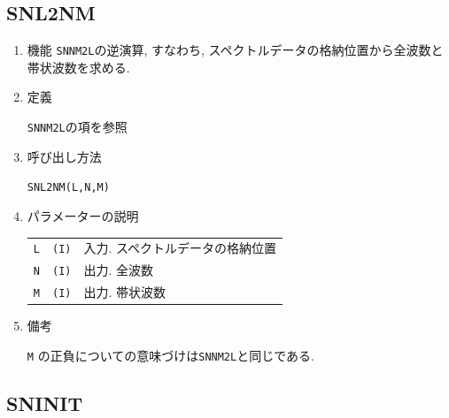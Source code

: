 \documentclass[a4j,fleqn]{jarticle}
\begin{document}

\subsection{SNL2NM}

\begin{enumerate}

\item 機能 
{\tt SNNM2L}の逆演算, すなわち, スペクトルデータの格納位置から全波数と
帯状波数を求める.

\item 定義

{\tt SNNM2L}の項を参照

\item 呼び出し方法 
    
{\tt SNL2NM(L,N,M)}
  
\item パラメーターの説明 

\begin{tabular}{lll}
{\tt L} & {\tt (I)} & 入力. スペクトルデータの格納位置\\
{\tt N} & {\tt (I)} & 出力. 全波数\\
{\tt M} & {\tt (I)} & 出力. 帯状波数
\end{tabular}

\item 備考

 {\tt M} の正負についての意味づけは{\tt SNNM2L}と同じである.

\end{enumerate}


\subsection{SNINIT}
\end{document}
